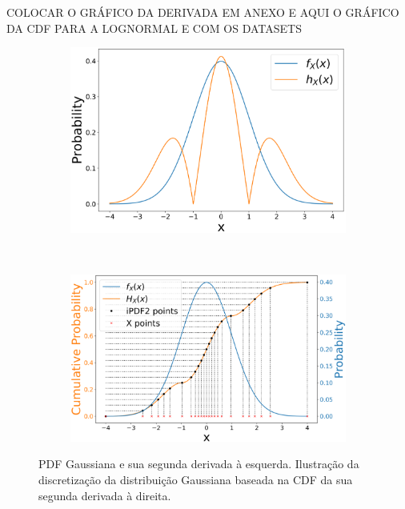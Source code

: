 {\color{red} COLOCAR O GRÁFICO DA DERIVADA EM ANEXO E AQUI O GRÁFICO DA CDF PARA A LOGNORMAL E COM OS DATASETS}

\begin{figure}[ht]
	\centering
	\begin{subfigure}[b]{0.44\textwidth}
		\centering 
		\includegraphics[width=\textwidth]{./figuras/ddpdf1.pdf}
		\caption{}
		\label{fig:ddPDF1}
	\end{subfigure}
	\hfill
	~ %
	\begin{subfigure}[b]{0.47\textwidth}
		\centering 
		\includegraphics[width=\textwidth]{./figuras/ddpdf2.pdf}
		\caption{}
		\label{fig:ddPDF2}
	\end{subfigure}
	
	\caption{PDF Gaussiana e sua segunda derivada à esquerda. Ilustração da discretização da distribuição Gaussiana baseada na CDF da sua segunda derivada à direita.}
	\label{fig:ddPDF}
\end{figure}
